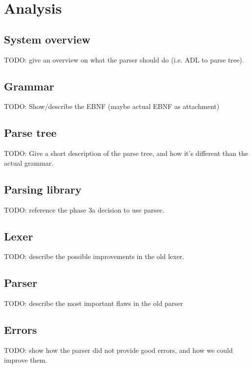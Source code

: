 
\section{Analysis}
\label{sec:analysis}

\subsection{System overview}
TODO: give an overview on what the parser should do (i.e. ADL to parse tree).

\subsection{Grammar}
TODO: Show/describe the EBNF (maybe actual EBNF as attachment)

\subsection{Parse tree}
TODO: Give a short description of the parse tree, and how it's different than the actual grammar.

\subsection{Parsing library}
TODO: reference the phase 3a decision to use parsec.

\subsection{Lexer}
TODO: describe the possible improvements in the old lexer.

\subsection{Parser}
TODO: describe the most important flaws in the old parser

\subsection{Errors}
TODO: show how the parser did not provide good errors, and how we could improve them.
